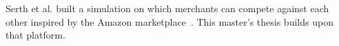 
Serth et al. built a simulation on which merchants can compete against each other inspired by the Amazon marketplace~\cite{DBLP:conf/recsys/0001SPSBLLSU17, edoc2017pricewars}.
This master's thesis builds upon that platform.


